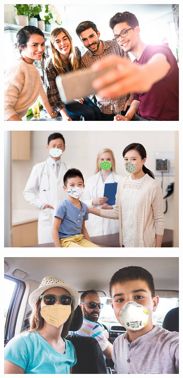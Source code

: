\documentclass[12pt,a4paper]{report}
\begin{document}
\begin{figure}[H]
\renewcommand*\thesubfigure{\arabic{subfigure}} 
\centering
\begin{subfigure}{.3\textwidth}
  \centering
  \includegraphics[width=1\linewidth]{image0}
  \caption{}
  \label{fig:sub1}
\end{subfigure}
\begin{subfigure}{.3\textwidth}
  \centering
  \includegraphics[width=1\linewidth]{image1}
  \caption{}
  \label{fig:sub2}
\end{subfigure}
\begin{subfigure}{.3\textwidth}
  \centering
  \includegraphics[width=1\linewidth]{image2}
  \caption{}
  \label{fig:sub3}
\end{subfigure}
\end{figure}
\end{document}
